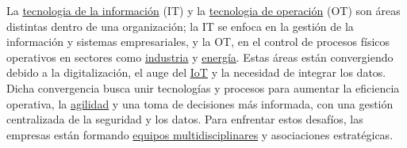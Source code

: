 La \underline{\textcolor{springViolet1}{tecnologia de la información}} (IT) y la \underline{\textcolor{springViolet1}{tecnologia de operación}} (OT) son áreas distintas dentro de una organización; 
la IT se enfoca en la gestión de la información y sistemas empresariales, y la OT, en el control de procesos físicos operativos en sectores
como \underline{\textcolor{springViolet1}{industria}} y \underline{\textcolor{springViolet1}{energía}}. Estas áreas están convergiendo debido a la 
digitalización, el auge del \underline{\textcolor{springViolet1}{IoT}} y la necesidad de integrar los datos. Dicha convergencia busca unir 
tecnologías y procesos para aumentar la eficiencia operativa, la \underline{\textcolor{springViolet1}{agilidad}} y una toma de decisiones más informada,
con una gestión centralizada de la seguridad y los datos. Para enfrentar estos desafíos, las empresas están formando \underline{\textcolor{springViolet1}{equipos multidisciplinares}}
y asociaciones estratégicas.




